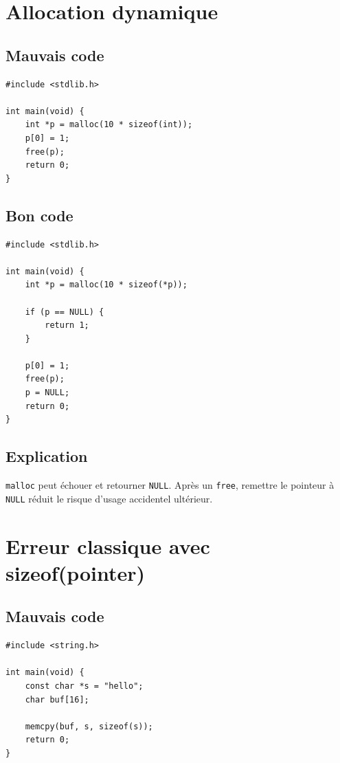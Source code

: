 \documentclass[a4paper,11pt]{report}
\begin{document}
\chapter{Allocation dynamique}

\section{Mauvais code}
\begin{lstlisting}
#include <stdlib.h>

int main(void) {
    int *p = malloc(10 * sizeof(int));
    p[0] = 1;
    free(p);
    return 0;
}
\end{lstlisting}

\section{Bon code}
\begin{lstlisting}
#include <stdlib.h>

int main(void) {
    int *p = malloc(10 * sizeof(*p));

    if (p == NULL) {
        return 1;
    }

    p[0] = 1;
    free(p);
    p = NULL;
    return 0;
}
\end{lstlisting}

\section{Explication}
\texttt{malloc} peut échouer et retourner \texttt{NULL}.
Après un \texttt{free}, remettre le pointeur à \texttt{NULL} réduit le risque d'usage accidentel ultérieur.

\chapter{Erreur classique avec sizeof(pointer)}

\section{Mauvais code}
\begin{lstlisting}
#include <string.h>

int main(void) {
    const char *s = "hello";
    char buf[16];

    memcpy(buf, s, sizeof(s));
    return 0;
}
\end{lstlisting}
\end{document}
